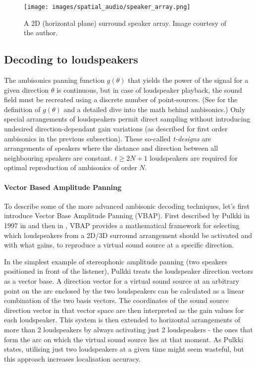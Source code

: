 \begin{figure}
    \centering
    \texttt{[image: images/spatial\_audio/speaker\_array.png]}
    \caption{A 2D (horizontal plane) surround speaker array. Image courtesy of the author. \label{fig:speaker_array}}
\end{figure}

\subsection{Decoding to loudspeakers}

The ambisonics panning function $g(\theta)$ 
that yields the power of the signal for a given direction $\theta$ is continuous,
but in case of loudspeaker playback, the sound field must be recreated using a discrete number of point-sources. 
(See \cite{ambisonics_practical_theory} for the definition of $g(\theta)$ and a detailed dive into the math behind ambisonics.)
Only special arrangements of loudspeakers permit direct sampling without introducing undesired
direction-dependant gain variations (as described for first order ambisonics in the previous subsection). 
These so-called \emph{t-designs} are arrangements of speakers where the distance and direction between 
all neighbouring speakers are constant. $t \geq 2N + 1$ loudspeakers 
are required for optimal reproduction of ambisonics of order $N$. \cite{ambisonics_practical_theory}\cite{zotter_all_round_panning_and_decoding}

\paragraph*{Vector Based Amplitude Panning}

To describe some of the more advanced ambisonic decoding techniques, let's first introduce Vector Base Amplitude Panning (VBAP).
First described by Pulkki in 1997 in \cite{pulkki_dsp_tool_vbap_1996} and then in \cite{pulkki_vbap_1997},
VBAP provides a mathematical framework for selecting which loudspeakers from a 2D/3D 
surround arrangement should be activated and with what gains, to reproduce a virtual sound source at a specific direction.

In the simplest example of stereophonic amplitude panning (two speakers positioned in front of the listener),
Pulkki treats the loudspeaker direction vectors as a vector base.
A direction vector for a virtual sound source at an arbitrary point on the arc enclosed by the two loudspeakers
can be calculated as a linear combination of the two basis vectors. The coordinates of the sound source direction vector in that vector space 
are then interpreted as the gain values for each loudspeaker. 
This system is then extended to horizontal arrangements of more than 2 loudspeakers by always activating 
just 2 loudspeakers - the ones that form the arc on which the virtual sound source lies at that moment. 
As Pulkki states, utilising just two loudspeakers at a given time might seem wasteful, but this approach increases 
localisation accuracy. 

